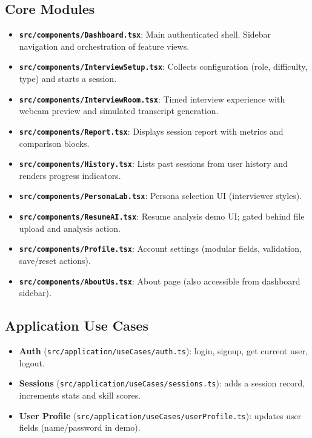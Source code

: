 \documentclass[11pt]{article}
\begin{document}
\subsection{Core Modules}
\begin{itemize}[leftmargin=1.2em]
  \item \textbf{\texttt{src/components/Dashboard.tsx}}: Main authenticated shell. Sidebar navigation and orchestration of feature views.
  \item \textbf{\texttt{src/components/InterviewSetup.tsx}}: Collects configuration (role, difficulty, type) and starts a session.
  \item \textbf{\texttt{src/components/InterviewRoom.tsx}}: Timed interview experience with webcam preview and simulated transcript generation.
  \item \textbf{\texttt{src/components/Report.tsx}}: Displays session report with metrics and comparison blocks.
  \item \textbf{\texttt{src/components/History.tsx}}: Lists past sessions from user history and renders progress indicators.
  \item \textbf{\texttt{src/components/PersonaLab.tsx}}: Persona selection UI (interviewer styles).
  \item \textbf{\texttt{src/components/ResumeAI.tsx}}: Resume analysis demo UI; gated behind file upload and analysis action.
  \item \textbf{\texttt{src/components/Profile.tsx}}: Account settings (modular fields, validation, save/reset actions).
  \item \textbf{\texttt{src/components/AboutUs.tsx}}: About page (also accessible from dashboard sidebar).
\end{itemize}

\subsection{Application Use Cases}
\begin{itemize}[leftmargin=1.2em]
  \item \textbf{Auth} (\texttt{src/application/useCases/auth.ts}): login, signup, get current user, logout.
  \item \textbf{Sessions} (\texttt{src/application/useCases/sessions.ts}): adds a session record, increments stats and skill scores.
  \item \textbf{User Profile} (\texttt{src/application/useCases/userProfile.ts}): updates user fields (name/password in demo).
\end{itemize}
\end{document}
